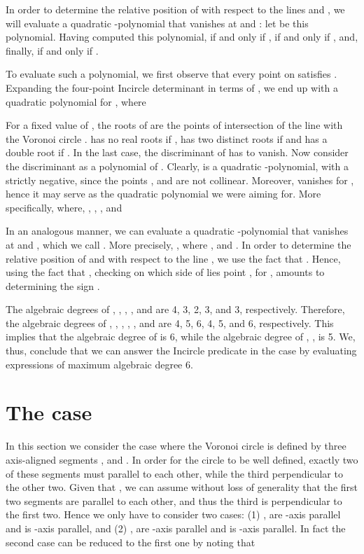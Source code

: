 \documentclass[letterpaper,11pt]{article}
\newcommand{\incircle}{\textsf{Incircle}\xspace}
\newcommand{\vor}{Voronoi\xspace}
\newcommand{\sss}{\xspace}
\newcommand{\ppps}{\xspace}
\begin{document}
{In order to determine the relative position of  with respect to the lines 
 and , we will evaluate a quadratic -polynomial 
that vanishes at  and : let 
be this polynomial.
Having computed this polynomial,  if and only
if ,
 if and only if ,
and, finally,  if and only if .

To evaluate such a polynomial, we first observe that every point 
on  satisfies . Expanding the four-point \incircle determinant in terms of , we end
up with a quadratic polynomial  for
, where


For a fixed value  of , the roots of 
are the points of intersection of the line  with the \vor
circle .  has no real roots if
, has two distinct roots if
 and has a double root if
. In the last case, the discriminant
 of  has to
vanish. Now consider the discriminant as a polynomial of . Clearly,
 is a quadratic -polynomial, with a strictly
negative, since the points ,  and  are not
collinear. Moreover,  vanishes for
, hence it may serve as the quadratic
polynomial  we were aiming for.
More specifically,  where, 
, , , and


In an analogous manner, we can evaluate a quadratic -polynomial
that vanishes at  and , which we call . More
precisely, , where
,  and .
In order to determine the relative position of   and  with
respect to the line , we use the fact that
. Hence, using the
fact that , checking on which side of  lies point ,
for , amounts to determining the sign
.

The algebraic degrees of , , , , and  are 4,
3, 2, 3, and 3, respectively. Therefore, the algebraic degrees of
, , , , , and  are 4, 5, 6, 4, 5, and 6,
respectively. This implies that the algebraic degree of  is 6,
while the algebraic degree of , , is 5. We,
thus, conclude that we can answer the \incircle predicate in the \ppps
case by evaluating expressions of maximum algebraic degree 6.




\section{The \sss case}\label{sec:sss}

In this section we consider the case where the \vor circle is defined
by three axis-aligned segments ,  and . In order for the
circle  to be well defined, exactly two of these segments
must parallel to each other, while the third perpendicular to the
other two.
Given that , we
can assume without loss of generality that the first two segments are
parallel to each other, and thus the third is perpendicular to the
first two. Hence we only have to consider two cases:
(1) ,  are -axis parallel and  is -axis parallel,
and
(2) ,  are -axis parallel and  is -axis parallel.
In fact the second case can be reduced to the first one by noting that

}
\end{document}
